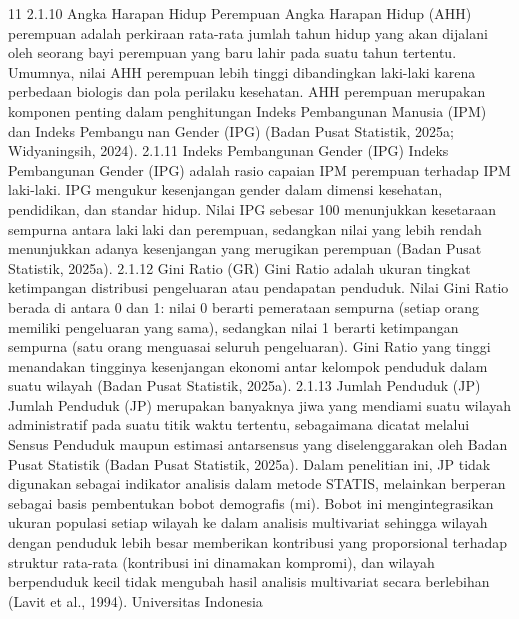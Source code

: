 11
2.1.10 Angka Harapan Hidup Perempuan
Angka Harapan Hidup (AHH) perempuan adalah perkiraan rata-rata jumlah tahun
hidup yang akan dijalani oleh seorang bayi perempuan yang baru lahir pada suatu tahun
tertentu. Umumnya, nilai AHH perempuan lebih tinggi dibandingkan laki-laki karena
perbedaan biologis dan pola perilaku kesehatan. AHH perempuan merupakan komponen
penting dalam penghitungan Indeks Pembangunan Manusia (IPM) dan Indeks Pembangunan Gender (IPG) (Badan Pusat Statistik, 2025a; Widyaningsih, 2024).
2.1.11 Indeks Pembangunan Gender (IPG)
Indeks Pembangunan Gender (IPG) adalah rasio capaian IPM perempuan terhadap
IPM laki-laki. IPG mengukur kesenjangan gender dalam dimensi kesehatan, pendidikan,
dan standar hidup. Nilai IPG sebesar 100 menunjukkan kesetaraan sempurna antara lakilaki dan perempuan, sedangkan nilai yang lebih rendah menunjukkan adanya kesenjangan
yang merugikan perempuan (Badan Pusat Statistik, 2025a).
2.1.12 Gini Ratio (GR)
Gini Ratio adalah ukuran tingkat ketimpangan distribusi pengeluaran atau pendapatan
penduduk. Nilai Gini Ratio berada di antara 0 dan 1: nilai 0 berarti pemerataan sempurna
(setiap orang memiliki pengeluaran yang sama), sedangkan nilai 1 berarti ketimpangan
sempurna (satu orang menguasai seluruh pengeluaran). Gini Ratio yang tinggi menandakan
tingginya kesenjangan ekonomi antar kelompok penduduk dalam suatu wilayah (Badan
Pusat Statistik, 2025a).
2.1.13 Jumlah Penduduk (JP)
Jumlah Penduduk (JP) merupakan banyaknya jiwa yang mendiami suatu wilayah
administratif pada suatu titik waktu tertentu, sebagaimana dicatat melalui Sensus Penduduk
maupun estimasi antarsensus yang diselenggarakan oleh Badan Pusat Statistik (Badan
Pusat Statistik, 2025a). Dalam penelitian ini, JP tidak digunakan sebagai indikator
analisis dalam metode STATIS, melainkan berperan sebagai basis pembentukan bobot
demografis (mi). Bobot ini mengintegrasikan ukuran populasi setiap wilayah ke dalam
analisis multivariat sehingga wilayah dengan penduduk lebih besar memberikan kontribusi
yang proporsional terhadap struktur rata-rata (kontribusi ini dinamakan kompromi), dan
wilayah berpenduduk kecil tidak mengubah hasil analisis multivariat secara berlebihan
(Lavit et al., 1994).
Universitas Indonesia

